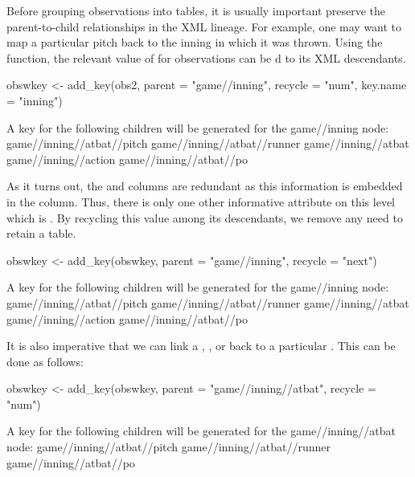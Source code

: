 \begin{article}
Before grouping observations into tables, it is usually important
preserve the parent-to-child relationships in the XML lineage. For
example, one may want to map a particular pitch back to the inning
in which it was thrown. Using the  function, the relevant
value of  for  observations can be
d to its XML descendants.
%
\begin{Schunk}
\begin{Sinput}
obswkey <- add_key(obs2, parent = "game//inning", recycle = "num", key.name = "inning")
\end{Sinput}
\begin{Soutput}
A key for the following children will be generated for the game//inning node:
game//inning//atbat//pitch
game//inning//atbat//runner
game//inning//atbat
game//inning//action
game//inning//atbat//po
\end{Soutput}
\end{Schunk}
%

As it turns out, the  and  columns
are redundant as this information is embedded in the  column.
Thus, there is only one other informative attribute on this level
which is . By recycling this value among its descendants,
we remove any need to retain a  table.
%
\begin{Schunk}
\begin{Sinput}
obswkey <- add_key(obswkey, parent = "game//inning", recycle = "next")
\end{Sinput}
\begin{Soutput}
A key for the following children will be generated for the game//inning node:
game//inning//atbat//pitch
game//inning//atbat//runner
game//inning//atbat
game//inning//action
game//inning//atbat//po
\end{Soutput}
\end{Schunk}
%

It is also imperative that we can link a , ,
or  back to a particular . This can be done
as follows:
%
\begin{Schunk}
\begin{Sinput}
obswkey <- add_key(obswkey, parent = "game//inning//atbat", recycle = "num")
\end{Sinput}
\begin{Soutput}
A key for the following children will be generated for the game//inning//atbat node:
game//inning//atbat//pitch
game//inning//atbat//runner
game//inning//atbat//po
\end{Soutput}
\end{Schunk}
%



\end{article}
